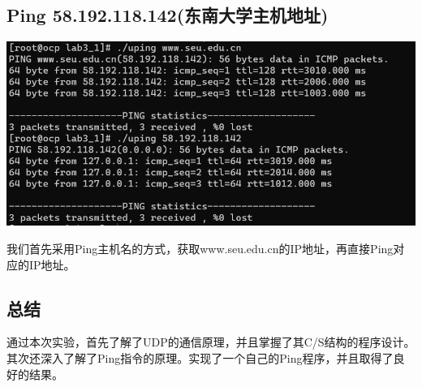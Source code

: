 \documentclass[UTF8]{ctexart}
\begin{document}
\subsection{Ping 58.192.118.142(东南大学主机地址)}
\par\centerline{\includegraphics[scale=0.6]{fig3.png}}
\par{我们首先采用Ping主机名的方式，获取www.seu.edu.cn的IP地址，再直接Ping对应的IP地址。}
\subsection{总结}
\par{通过本次实验，首先了解了UDP的通信原理，并且掌握了其C/S结构的程序设计。其次还深入了解了Ping指令的原理。实现了一个自己的Ping程序，并且取得了良好的结果。}
\end{document}
